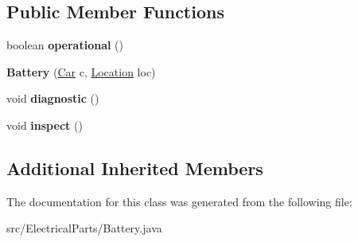 \subsection*{Public Member Functions}
\begin{DoxyCompactItemize}
\item 
\hypertarget{classElectricalParts_1_1Battery_ae595503240f210b0c2f57098b8c25067}{}boolean {\bfseries operational} ()\label{classElectricalParts_1_1Battery_ae595503240f210b0c2f57098b8c25067}

\item 
\hypertarget{classElectricalParts_1_1Battery_a9e7801530ef808b20252ef73c2d2c96c}{}{\bfseries Battery} (\hyperlink{classCars_1_1Car}{Car} c, \hyperlink{enumEnums_1_1Location}{Location} loc)\label{classElectricalParts_1_1Battery_a9e7801530ef808b20252ef73c2d2c96c}

\item 
\hypertarget{classElectricalParts_1_1Battery_abf3d6f5e7e7b77bbce046f7446a6a879}{}void {\bfseries diagnostic} ()\label{classElectricalParts_1_1Battery_abf3d6f5e7e7b77bbce046f7446a6a879}

\item 
\hypertarget{classElectricalParts_1_1Battery_a132c17ac42aef8470a7f79dde015f9a5}{}void {\bfseries inspect} ()\label{classElectricalParts_1_1Battery_a132c17ac42aef8470a7f79dde015f9a5}

\end{DoxyCompactItemize}
\subsection*{Additional Inherited Members}


The documentation for this class was generated from the following file\+:\begin{DoxyCompactItemize}
\item 
src/\+Electrical\+Parts/Battery.\+java\end{DoxyCompactItemize}
